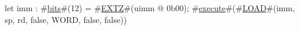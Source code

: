 let imm : #\hyperref[sailRISCVzbits]{bits}#(12) = #\hyperref[sailRISCVzEXTZ]{EXTZ}#(uimm @ 0b00);
#\hyperref[sailRISCVzexecute]{execute}#(#\hyperref[sailRISCVzLOAD]{LOAD}#(imm, sp, rd, false, WORD, false, false))
